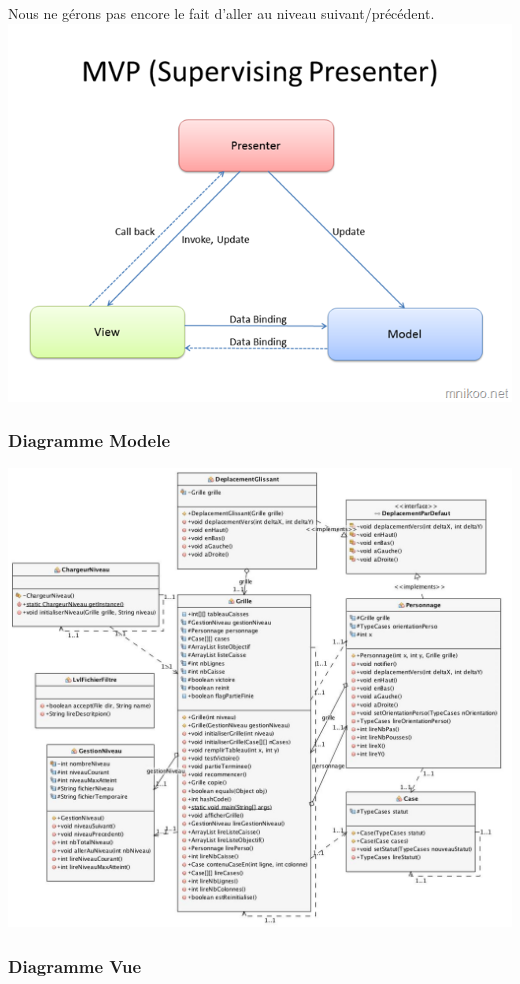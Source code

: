\documentclass[a4paper,12pt]{article} %
\begin{document}
\newline
Nous ne gérons pas encore le fait d’aller au niveau suivant/précédent.
\newline\newline
\includegraphics[scale=1]{mvp.png}
\newpage
\subsubsection{Diagramme Modele}

\includegraphics[scale=0.43]{modele2.jpg}
\newpage
\subsubsection{Diagramme Vue}
\end{document}
